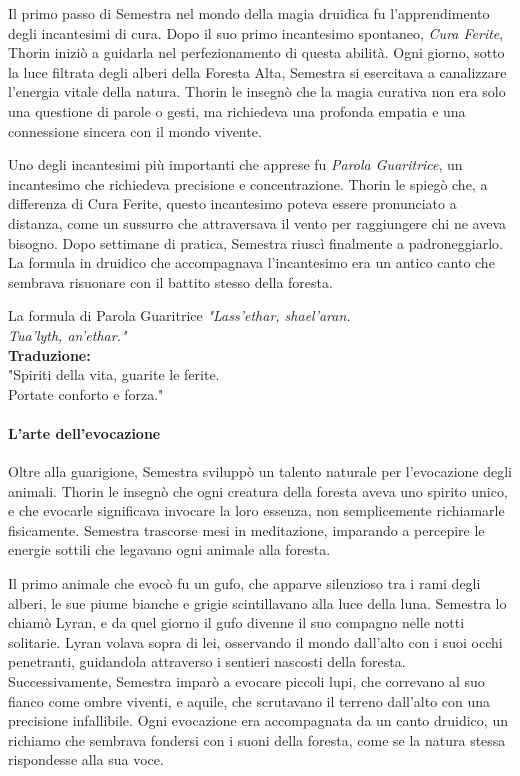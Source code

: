\documentclass[letterpaper,twocolumn,openany,nodeprecatedcode]{dndbook}
\begin{document}
Il primo passo di Semestra nel mondo della magia druidica fu l’apprendimento degli incantesimi di cura. Dopo il suo primo incantesimo spontaneo, \textit{Cura Ferite}, Thorin iniziò a guidarla nel perfezionamento di questa abilità. Ogni giorno, sotto la luce filtrata degli alberi della Foresta Alta, Semestra si esercitava a canalizzare l’energia vitale della natura. Thorin le insegnò che la magia curativa non era solo una questione di parole o gesti, ma richiedeva una profonda empatia e una connessione sincera con il mondo vivente. 

Uno degli incantesimi più importanti che apprese fu \textit{Parola Guaritrice}, un incantesimo che richiedeva precisione e concentrazione. Thorin le spiegò che, a differenza di Cura Ferite, questo incantesimo poteva essere pronunciato a distanza, come un sussurro che attraversava il vento per raggiungere chi ne aveva bisogno. Dopo settimane di pratica, Semestra riuscì finalmente a padroneggiarlo. La formula in druidico che accompagnava l’incantesimo era un antico canto che sembrava risuonare con il battito stesso della foresta.

\begin{DndSidebar}[float=!b]{La formula di Parola Guaritrice}
  \textit{
    "Lass'ethar, shael'aran.\\
    Tua'lyth, an'ethar."\\
  }
  \textbf{Traduzione:}\\
  "Spiriti della vita, guarite le ferite.\\  
  Portate conforto e forza."
\end{DndSidebar}

\paragraph{L’arte dell’evocazione}

Oltre alla guarigione, Semestra sviluppò un talento naturale per l’evocazione degli animali. Thorin le insegnò che ogni creatura della foresta aveva uno spirito unico, e che evocarle significava invocare la loro essenza, non semplicemente richiamarle fisicamente. Semestra trascorse mesi in meditazione, imparando a percepire le energie sottili che legavano ogni animale alla foresta. 

Il primo animale che evocò fu un gufo, che apparve silenzioso tra i rami degli alberi, le sue piume bianche e grigie scintillavano alla luce della luna. Semestra lo chiamò Lyran, e da quel giorno il gufo divenne il suo compagno nelle notti solitarie. Lyran volava sopra di lei, osservando il mondo dall’alto con i suoi occhi penetranti, guidandola attraverso i sentieri nascosti della foresta. Successivamente, Semestra imparò a evocare piccoli lupi, che correvano al suo fianco come ombre viventi, e aquile, che scrutavano il terreno dall’alto con una precisione infallibile. Ogni evocazione era accompagnata da un canto druidico, un richiamo che sembrava fondersi con i suoni della foresta, come se la natura stessa rispondesse alla sua voce.
\end{document}
